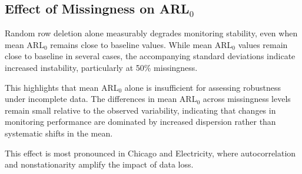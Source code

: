 \begin{table}[htbp]
\centering
\caption{ARL$_0$ performance with standard deviation under missingness relative to baseline}
\label{tab:arl0_missing_rel}
\end{table}

\subsection{Effect of Missingness on \ac{ARL}$_0$}

Random row deletion alone measurably degrades monitoring stability, even when mean \ac{ARL}$_0$ remains close to baseline values. While mean \ac{ARL}$_0$ values remain close to baseline in several cases, the accompanying standard deviations indicate increased instability, particularly at 50\% missingness.

This highlights that mean \ac{ARL}$_0$ alone is insufficient for assessing robustness under incomplete data. The differences in mean \ac{ARL}$_0$ across missingness levels remain small relative to the observed variability, indicating that changes in monitoring performance are dominated by increased dispersion rather than systematic shifts in the mean.

This effect is most pronounced in Chicago and Electricity, where autocorrelation and nonstationarity amplify the impact of data loss.

